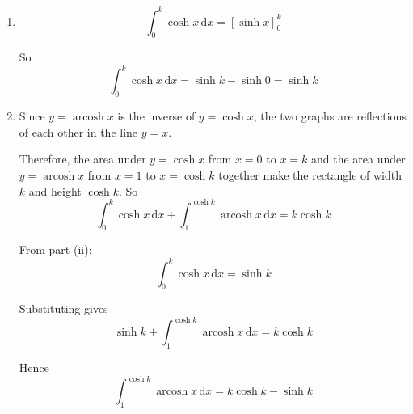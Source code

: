 \documentclass[leqno]{article}
\begin{document}
\begin{enumerate}[
  label=\textbf{\arabic*.},
  leftmargin=*,
  topsep=0pt,
  partopsep=0pt,
  parsep=0pt
]
\begin{djsSolution}
\begin{enumerate}[label=\textbf{(\roman*)}]
For \(y=\cosh x\), \(\frac{\mathrm{d}y}{\mathrm{d}x}=\sinh x\), so the gradient at \(x=0\) is \(\sinh 0=0\).

\(y=\operatorname{arcosh}x\) is the inverse of \(y=\cosh x\) for \(x\ge 0\), so its graph is the reflection of \(y=\cosh x\) in the line of symmetry \(y=x\).

\item
\[
\int_0^k \cosh x\,\mathrm{d}x=[\sinh x]_0^k
\]

So
\[
\int_0^k \cosh x\,\mathrm{d}x=\sinh k-\sinh 0=\sinh k
\]


\item Since \(y=\operatorname{arcosh}x\) is the inverse of \(y=\cosh x\), the two graphs are reflections of each other in the line \(y=x\).

Therefore, the area under \(y=\cosh x\) from \(x=0\) to \(x=k\) and the area under \(y=\operatorname{arcosh}x\) from \(x=1\) to \(x=\cosh k\) together make the rectangle of width \(k\) and height \(\cosh k\). So
\[
\int_0^k \cosh x\,\mathrm{d}x+\int_1^{\cosh k}\operatorname{arcosh}x\,\mathrm{d}x=k\cosh k
\]

From part (ii):
\[
\int_0^k \cosh x\,\mathrm{d}x=\sinh k
\]

Substituting gives
\[
\sinh k+\int_1^{\cosh k}\operatorname{arcosh}x\,\mathrm{d}x=k\cosh k
\]

Hence
\[
\int_1^{\cosh k}\operatorname{arcosh}x\,\mathrm{d}x=k\cosh k-\sinh k
\]

\end{enumerate}
\end{djsSolution}


\newpage

\questionitem


\end{enumerate}
\end{document}
